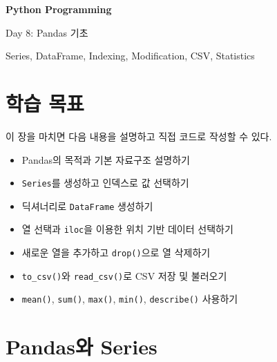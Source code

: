 \documentclass[11pt,a4paper]{article}
\begin{document}
\begin{titlepage}
    \centering
    \vspace*{3cm}

    {\Huge\bfseries Python Programming\par}
    \vspace{0.8cm}
    {\LARGE Day 8: Pandas 기초\par}

    \vspace{2cm}

    {\large Series, DataFrame, Indexing, Modification, CSV, Statistics\par}

    \vfill
\end{titlepage}

\tableofcontents
\newpage

\section{학습 목표}

\begin{learningbox}
이 장을 마치면 다음 내용을 설명하고 직접 코드로 작성할 수 있다.
\begin{itemize}[leftmargin=1.5em]
    \item Pandas의 목적과 기본 자료구조 설명하기
    \item \texttt{Series}를 생성하고 인덱스로 값 선택하기
    \item 딕셔너리로 \texttt{DataFrame} 생성하기
    \item 열 선택과 \texttt{iloc}을 이용한 위치 기반 데이터 선택하기
    \item 새로운 열을 추가하고 \texttt{drop()}으로 열 삭제하기
    \item \texttt{to\_csv()}와 \texttt{read\_csv()}로 CSV 저장 및 불러오기
    \item \texttt{mean()}, \texttt{sum()}, \texttt{max()}, \texttt{min()}, \texttt{describe()} 사용하기
\end{itemize}
\end{learningbox}

\section{Pandas와 Series}
\end{document}
